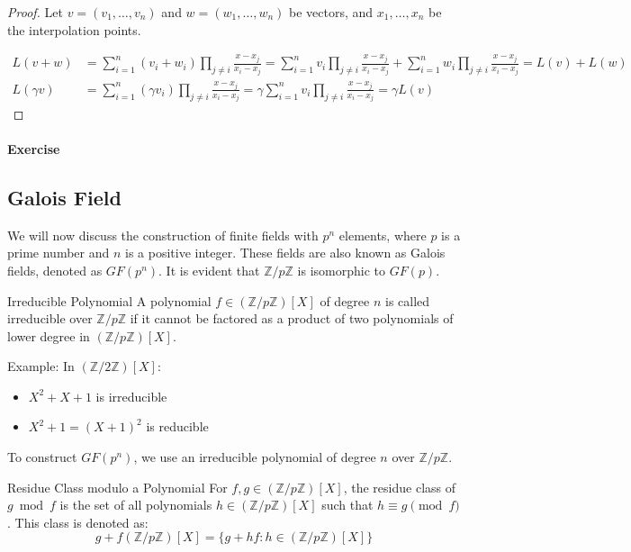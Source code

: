 \documentclass{article}
\begin{document}
\begin{proof}
    
Let $v = (v_1, \ldots, v_n)$ and $w = (w_1, \ldots, w_n)$ be vectors, and $x_1, \ldots, x_n$ be the interpolation points.

\begin{align*}
    L(v + w) &= \sum_{i=1}^n (v_i + w_i) \prod_{j \neq i} \frac{x - x_j}{x_i - x_j} = \sum_{i=1}^n v_i \prod_{j \neq i} \frac{x - x_j}{x_i - x_j} + \sum_{i=1}^n w_i \prod_{j \neq i} \frac{x - x_j}{x_i - x_j} = L(v) + L(w) \\
    L(\gamma v) &= \sum_{i=1}^n (\gamma v_i) \prod_{j \neq i} \frac{x - x_j}{x_i - x_j} = \gamma \sum_{i=1}^n v_i \prod_{j \neq i} \frac{x - x_j}{x_i - x_j} = \gamma L(v)
\end{align*}
\end{proof}

\paragraph{Exercise}

\subsection{Galois Field}

We will now discuss the construction of finite fields with $p^n$ elements, where $p$ is a prime number and $n$ is a positive integer. These fields are also known as Galois fields, denoted as $GF(p^n)$. It is evident that $\mathbb{Z}/p\mathbb{Z}$ is isomorphic to $GF(p)$.


\begin{definition}{Irreducible Polynomial}{}
A polynomial $f \in (\mathbb{Z}/p\mathbb{Z})[X]$ of degree $n$ is called irreducible over $\mathbb{Z}/p\mathbb{Z}$ if it cannot be factored as a product of two polynomials of lower degree in $(\mathbb{Z}/p\mathbb{Z})[X]$.
\end{definition}

Example: In $(\mathbb{Z}/2\mathbb{Z})[X]$:
\begin{itemize}
    \item $X^2 + X + 1$ is irreducible
    \item $X^2 + 1 = (X + 1)^2$ is reducible
\end{itemize}

To construct $GF(p^n)$, we use an irreducible polynomial of degree $n$ over $\mathbb{Z}/p\mathbb{Z}$.

\begin{definition}{Residue Class modulo a Polynomial}{}
For $f, g \in (\mathbb{Z}/p\mathbb{Z})[X]$, the residue class of $g \bmod f$ is the set of all polynomials $h \in (\mathbb{Z}/p\mathbb{Z})[X]$ such that $h \equiv g \pmod{f}$. This class is denoted as:
\[ g + f(\mathbb{Z}/p\mathbb{Z})[X] = \{g + hf : h \in (\mathbb{Z}/p\mathbb{Z})[X]\} \]
\end{definition}
\end{document}
